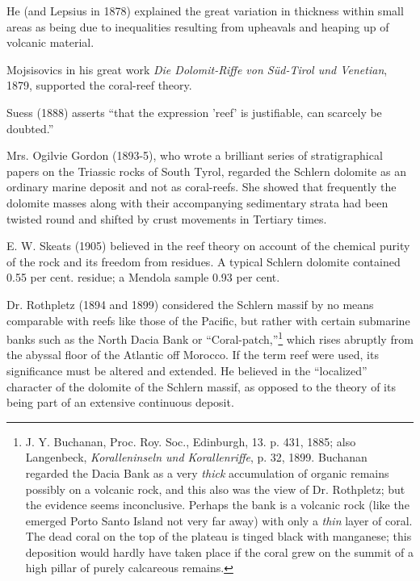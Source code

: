 \documentclass[a4paper, 12pt, oneside]{article}
\begin{document}
He (and Lepsius in 1878) explained the great variation in thickness within small areas as being due to inequalities resulting from upheavals and heaping up of volcanic material.

Mojsisovics in his great work \emph{Die Dolomit-Riffe von Süd-Tirol und Venetian}, 1879, supported the coral-reef theory.

Suess (1888) asserts ``that the expression 'reef' is justifiable, can scarcely be doubted.''

Mrs. Ogilvie Gordon (1893-5), who wrote a brilliant series of stratigraphical papers on the Triassic rocks of South Tyrol, regarded the Schlern dolomite as an ordinary marine deposit and not as coral-reefs. She showed that frequently the dolomite masses along with their accompanying sedimentary strata had been twisted round and shifted by crust movements in Tertiary times.

E. W. Skeats (1905) believed in the reef theory on account of the chemical purity of the rock and its freedom from residues. A typical Schlern dolomite contained 0.55 per cent. residue; a Mendola sample 0.93 per cent.

Dr. Rothpletz (1894 and 1899) considered the Schlern massif by no means comparable with reefs like those of the Pacific, but rather with certain submarine banks such as the North Dacia Bank or ``Coral-patch,''\footnote{J. Y. Buchanan, Proc. Roy. Soc., Edinburgh, 13. p. 431, 1885; also Langenbeck, \emph{Koralleninseln und Korallenriffe}, p. 32, 1899. Buchanan regarded the Dacia Bank as a very \emph{thick} accumulation of organic remains possibly on a volcanic rock, and this also was the view of Dr. Rothpletz; but the evidence seems inconclusive. Perhaps the bank is a volcanic rock (like the emerged Porto Santo Island not very far away) with only a \emph{thin} layer of coral. The dead coral on the top of the plateau is tinged black with manganese; this deposition would hardly have taken place if the coral grew on the summit of a high pillar of purely calcareous remains.} which rises abruptly from the abyssal floor of the Atlantic off Morocco. If the term reef were used, its significance must be altered and extended. He believed in the ``localized'' character of the dolomite of the Schlern massif, as opposed to the theory of its being part of an extensive continuous deposit.
\end{document}
